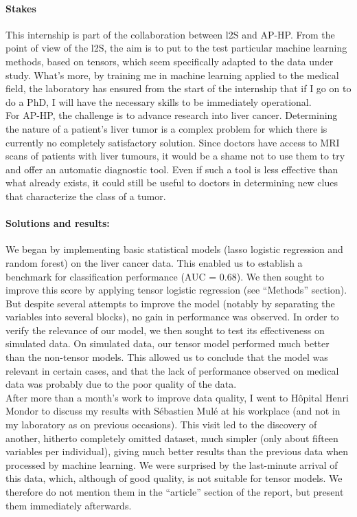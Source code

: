 \documentclass[preprint,12pt]{elsarticle}
\begin{document}
\paragraph*{Stakes} This internship is part of the collaboration between l2S and AP-HP. From the point of view of the l2S, the aim is to put to the test particular machine learning methods, based on tensors, which seem specifically adapted to the data under study. What's more, by training me in machine learning applied to the medical field, the laboratory has ensured from the start of the internship that if I go on to do a PhD, I will have the necessary skills to be immediately operational.\\
\indent For AP-HP, the challenge is to advance research into liver cancer. Determining the nature of a patient's liver tumor is a complex problem for which there is currently no completely satisfactory solution. Since doctors have access to MRI scans of patients with liver tumours, it would be a shame not to use them to try and offer an automatic diagnostic tool. Even if such a tool is less effective than what already exists, it could still be useful to doctors in determining new clues that characterize the class of a tumor.

\paragraph*{Solutions and results:} We began by implementing basic statistical models (lasso logistic regression and random forest) on the liver cancer data. This enabled us to establish a benchmark for classification performance (AUC = 0.68). We then sought to improve this score by applying tensor logistic regression (see “Methods” section). But despite several attempts to improve the model (notably by separating the variables into several blocks), no gain in performance was observed. In order to verify the relevance of our model, we then sought to test its effectiveness on simulated data. On simulated data, our tensor model performed much better than the non-tensor models. This allowed us to conclude that the model was relevant in certain cases, and that the lack of performance observed on medical data was probably due to the poor quality of the data.\\
\indent After more than a month's work to improve data quality, I went to Hôpital Henri Mondor to discuss my results with Sébastien Mulé at his workplace (and not in my laboratory as on previous occasions). This visit led to the discovery of another, hitherto completely omitted dataset, much simpler (only about fifteen variables per individual), giving much better results than the previous data when processed by machine learning. We were surprised by the last-minute arrival of this data, which, although of good quality, is not suitable for tensor models. We therefore do not mention them in the “article” section of the report, but present them immediately afterwards.
\end{document}
